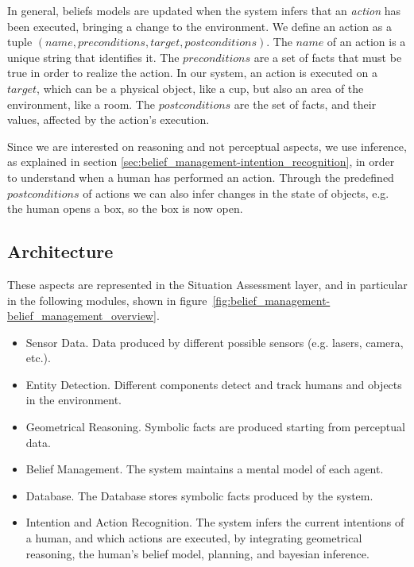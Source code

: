 In general, beliefs models are updated when the system infers that an \textit{action} has been executed, bringing a change to the environment.  We define an action as a tuple $(name, preconditions, target, postconditions)$. The $name$ of an action is a unique string that identifies it. The $preconditions$ are a set of facts that must be true in order to realize the action. In our system, an action is executed on a $target$, which can be a physical object, like a cup, but also an area of the environment, like a room. The $postconditions$ are the set of facts, and their values, affected by the action's execution.  


Since we are interested on reasoning and not perceptual aspects, we use inference, as explained in section \ref{sec:belief_management-intention_recognition}, in order to understand when a human has performed an action. Through the predefined $postconditions$ of actions we can also infer changes in the state of objects, e.g. the human opens a box, so the box is now open. 


\subsection{Architecture}
These aspects are represented in the Situation Assessment layer, and in particular in the following modules, shown in figure~\ref{fig:belief_management-belief_management_overview}.

\begin{itemize}
\item Sensor Data. Data produced by different possible sensors (e.g. lasers, camera, etc.).
\item Entity Detection. Different components detect and track humans and objects in the environment.
\item Geometrical Reasoning. Symbolic facts are produced starting from perceptual data.
\item Belief Management. The system maintains a mental model of each agent.
\item Database. The Database stores symbolic facts produced by the system.
\item Intention and Action Recognition. The system infers the current intentions of a human, and which actions are executed, by integrating  geometrical reasoning, the human's belief model, planning, and bayesian inference.
\end{itemize}

